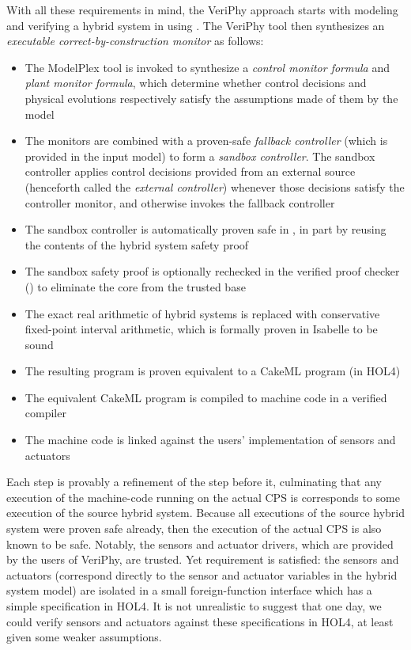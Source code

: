 \documentclass[12pt]{cmuthesis}
\theoremstyle{definition}
\theoremstyle{remark}
\newcommand{\rref}[2][]{\prettyref{#2}}
\newcommand{\VeriPhy}{VeriPhy\xspace}
\newcommand{\ModelPlex}{ModelPlex\xspace}
\begin{document}
With all these requirements in mind, the \VeriPhy approach starts with modeling and verifying a hybrid system in \dL using \KeYmaeraX.
The \VeriPhy tool then synthesizes an \emph{executable correct-by-construction monitor}  as follows:
\begin{itemize}
\item The \ModelPlex tool is invoked to synthesize a \emph{control monitor formula} and \emph{plant monitor formula}, which determine whether control decisions and physical evolutions respectively satisfy the assumptions made of them by the model
\item The monitors are combined with a proven-safe \emph{fallback controller} (which is provided in the input model) to form a \emph{sandbox controller}.
   The sandbox controller applies control decisions provided from an external source (henceforth called the \emph{external controller}) whenever those decisions satisfy the controller monitor,
   and otherwise invokes the fallback controller
\item The sandbox controller is automatically proven safe in \KeYmaeraX, in part by reusing the contents of the hybrid system safety proof
\item The sandbox safety proof is optionally rechecked in the verified proof checker (\rref{sec:isabelle-fml}) to eliminate the \KeYmaeraX core from the trusted base
\item The exact real arithmetic of hybrid systems is replaced with conservative fixed-point interval arithmetic, which is formally proven in Isabelle to be sound
\item The resulting program is proven equivalent to a CakeML program (in HOL4)
\item The equivalent CakeML program is compiled to machine code in a verified compiler
\item The machine code is linked against the users' implementation of sensors and actuators
\end{itemize}
Each step is provably a refinement of the step before it, culminating that any execution of the machine-code running on the actual CPS is corresponds to some execution of the source hybrid system.
Because all executions of the source hybrid system were proven safe already, then the execution of the actual CPS is also known to be safe.
Notably, the sensors and actuator drivers, which are provided by the users of \VeriPhy, are trusted.
Yet requirement \label{item:open-ended} is satisfied: the sensors and actuators (correspond directly to the sensor and actuator variables in the hybrid system model) are isolated in a small foreign-function interface which has a simple specification in HOL4.
It is not unrealistic to suggest that one day, we could verify sensors and actuators against these specifications in HOL4, at least given some weaker assumptions.
\end{document}
